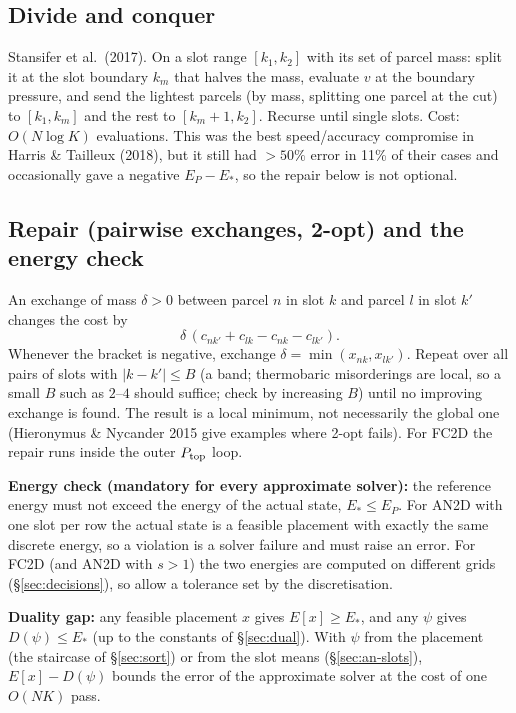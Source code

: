 \documentclass[11pt,a4paper]{article}
\newcommand{\Ptop}{P_{\rm top}}
\begin{document}
\subsection{Divide and conquer}
Stansifer et al.\ (2017). On a slot range $[k_1,k_2]$ with its set of parcel mass: split it at the slot boundary
$k_m$ that halves the mass, evaluate $v$ at the boundary pressure, and send the lightest parcels (by mass, splitting one
parcel at the cut) to $[k_1,k_m]$ and the rest to $[k_m+1,k_2]$. Recurse until single slots. Cost: $O(N\log K)$ evaluations.
This was the best speed/accuracy compromise in Harris \& Tailleux (2018), but it still had $>50\%$ error in 11\% of their
cases and occasionally gave a negative $E_P-E_*$, so the repair below is not optional.

\subsection{Repair (pairwise exchanges, 2-opt) and the energy check}\label{sec:repair}
An exchange of mass $\delta>0$ between parcel $n$ in slot $k$ and parcel $l$ in slot $k'$ changes the cost by
\begin{equation}
  \delta\,\left(c_{nk'}+c_{lk}-c_{nk}-c_{lk'}\right).
\end{equation}
Whenever the bracket is negative, exchange $\delta=\min(x_{nk},x_{lk'})$. Repeat over all pairs of slots with
$|k-k'|\le B$ (a band; thermobaric misorderings are local, so a small $B$ such as $2$--$4$ should suffice; check by
increasing $B$) until no improving exchange is found. The result is a local minimum, not necessarily the global one
(Hieronymus \& Nycander 2015 give examples where 2-opt fails). For FC2D the repair runs inside the outer $\Ptop$ loop.

\textbf{Energy check (mandatory for every approximate solver):} the reference energy must not exceed the energy of the
actual state, $E_*\le E_P$. For AN2D with one slot per row the actual state is a feasible placement with exactly the same discrete
energy, so a violation is a solver failure and must raise an error. For FC2D (and AN2D with $s>1$) the two energies are
computed on different grids (\S\ref{sec:decisions}), so allow a tolerance set by the discretisation.

\textbf{Duality gap:} any feasible placement $x$ gives $E[x]\ge E_*$, and any $\psi$ gives $D(\psi)\le E_*$ (up to the constants of
\S\ref{sec:dual}). With $\psi$ from the placement (the staircase of \S\ref{sec:sort}) or from the slot means
(\S\ref{sec:an-slots}), $E[x]-D(\psi)$ bounds the error of the approximate solver at the cost of one $O(NK)$ pass.
\end{document}
